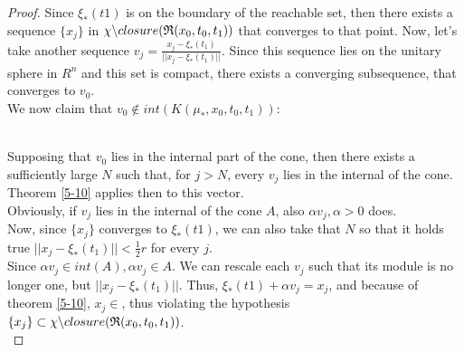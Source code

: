 \begin{proof}
		Since $\xi_*(t1)$ is on the boundary of the reachable set, then there exists a sequence $\{x_j\}$ in $\chi\backslash closure(\mathfrak{R}(x_0,t_0,t_1))$ that converges to that point. Now, let's take another sequence $v_j=\frac{x_j-\xi_*(t_1)}{||x_j-\xi_*(t_1)||}$. Since this sequence lies on the unitary sphere in $R^{n}$ and this set is compact, there exists a converging subsequence, that converges to $v_0$.\\
	We now claim that $v_0\notin int(K(\mu_*,x_0,t_0,t_1))$:\\\\
	\begin{minipage}{0.07\linewidth}
		 \mbox{}
	\end{minipage}
	\begin{minipage}{0.9\linewidth}
		 Supposing that $v_0$ lies in the internal part of the cone, then there exists a sufficiently large $N$ such that, for $j>N$, every $v_j$ lies in the internal of the cone. Theorem \ref{5-10} applies then to this vector.\\
		 Obviously, if $v_j$ lies in the internal of the cone $A$, also $\alpha v_j,\alpha>0$ does.\\
		 Now, since $\{x_j\}$ converges to $\xi_*(t1)$, we can also take that $N$ so that it holds true  $||x_j-\xi_*(t_1)||<\frac{1}{2}r$ for every $j$.\\
		 Since $\alpha v_j\in int(A), \alpha v_j\in A$. We can rescale each $v_j$ such that its module is no longer one, but $||x_j-\xi_*(t_1)||$. Thus, $\xi_*(t1)+\alpha v_j=x_j$, and because of theorem \ref{5-10}, $x_j\in$, thus violating the hypothesis $\{x_j\}\subset\chi\backslash closure(\mathfrak{R}(x_0,t_0,t_1))$.\\
		 

\end{minipage}
\end{proof}
